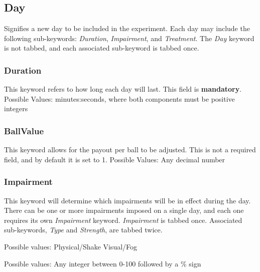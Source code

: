 \documentclass{article}
\begin{document}
\pagebreak\subsection{Day}
Signifies a new day to be included in the experiment. Each day may include the following sub-keywords: \textit{Duration}, \textit{Impairment}, and \textit{Treatment}. The \textit{Day} keyword is not tabbed, and each associated sub-keyword is tabbed once.

\subsubsection{Duration}
This keyword refers to how long each day will last. This field is \textbf{mandatory}. \newline
\indent Possible Values: \newline
\indent\indent minutes:seconds, where both components must be positive integers

\subsubsection{BallValue}
This keyword allows for the payout per ball to be adjusted. This is not a required field, and by default it is set to 1. \newline
\indent Possible Values: \newline
\indent\indent Any decimal number

\subsubsection{Impairment}
This keyword will determine which impairments will be in effect during the day. There can be one or more impairments imposed on a single day, and each one requires its own \textit{Impairment} keyword. \textit{Impairment} is tabbed once. Associated sub-keywords, \textit{Type} and \textit{Strength}, are tabbed twice. \newline

 \newline
\indent Possible values: \newline
\indent\indent Physical/Shake \newline
\indent\indent Visual/Fog \newline

 \newline
\indent Possible values: \newline
\indent\indent Any integer between 0-100 followed by a \% sign \newline
\end{document}
